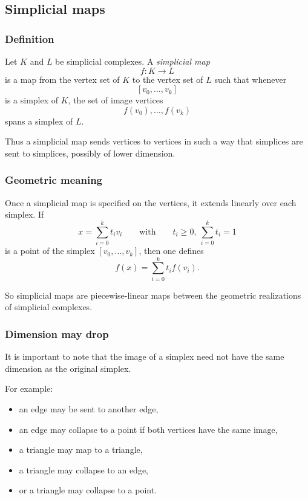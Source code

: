 \documentclass[12pt,a4paper]{article}
\theoremstyle{notespace}
\begin{document}
\subsection{Simplicial maps}

\subsubsection{Definition}

Let \(K\) and \(L\) be simplicial complexes. A \emph{simplicial map}
\[
f:K\to L
\]
is a map from the vertex set of \(K\) to the vertex set of \(L\) such that whenever
\[
[v_0,\dots,v_k]
\]
is a simplex of \(K\), the set of image vertices
\[
f(v_0),\dots,f(v_k)
\]
spans a simplex of \(L\).

Thus a simplicial map sends vertices to vertices in such a way that simplices are sent to simplices, possibly of lower dimension.

\subsubsection{Geometric meaning}

Once a simplicial map is specified on the vertices, it extends linearly over each simplex. If
\[
x=\sum_{i=0}^k t_i v_i
\qquad\text{with}\qquad
t_i\ge 0,\ \sum_{i=0}^k t_i=1
\]
is a point of the simplex \([v_0,\dots,v_k]\), then one defines
\[
f(x)=\sum_{i=0}^k t_i f(v_i).
\]

So simplicial maps are piecewise-linear maps between the geometric realizations of simplicial complexes.

\subsubsection{Dimension may drop}

It is important to note that the image of a simplex need not have the same dimension as the original simplex.

For example:
\begin{itemize}
	\item an edge may be sent to another edge,
	\item an edge may collapse to a point if both vertices have the same image,
	\item a triangle may map to a triangle,
	\item a triangle may collapse to an edge,
	\item or a triangle may collapse to a point.
\end{itemize}
\end{document}
